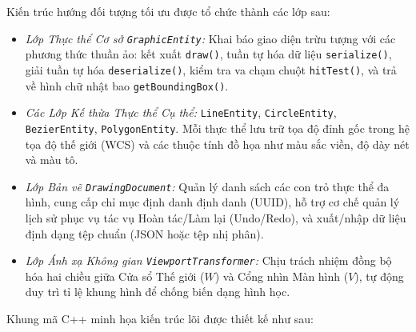 Kiến trúc hướng đối tượng tối ưu được tổ chức thành các lớp sau:
\begin{itemize}
    \item \textit{Lớp Thực thể Cơ sở \texttt{GraphicEntity}:} Khai báo giao diện trừu tượng với các phương thức thuần ảo: kết xuất \texttt{draw()}, tuần tự hóa dữ liệu \texttt{serialize()}, giải tuần tự hóa \texttt{deserialize()}, kiểm tra va chạm chuột \texttt{hitTest()}, và trả về hình chữ nhật bao \texttt{getBoundingBox()}.
    \item \textit{Các Lớp Kế thừa Thực thể Cụ thể:} \texttt{LineEntity}, \texttt{CircleEntity}, \texttt{BezierEntity}, \texttt{PolygonEntity}. Mỗi thực thể lưu trữ tọa độ đỉnh gốc trong hệ tọa độ thế giới (WCS) và các thuộc tính đồ họa như màu sắc viền, độ dày nét và màu tô.
    \item \textit{Lớp Bản vẽ \texttt{DrawingDocument}:} Quản lý danh sách các con trỏ thực thể đa hình, cung cấp chỉ mục định danh định danh (UUID), hỗ trợ cơ chế quản lý lịch sử phục vụ tác vụ Hoàn tác/Làm lại (Undo/Redo), và xuất/nhập dữ liệu định dạng tệp chuẩn (JSON hoặc tệp nhị phân).
    \item \textit{Lớp Ánh xạ Không gian \texttt{ViewportTransformer}:} Chịu trách nhiệm đồng bộ hóa hai chiều giữa Cửa sổ Thế giới ($W$) và Cổng nhìn Màn hình ($V$), tự động duy trì tỉ lệ khung hình để chống biến dạng hình học.
\end{itemize}

Khung mã C++ minh họa kiến trúc lõi được thiết kế như sau:

